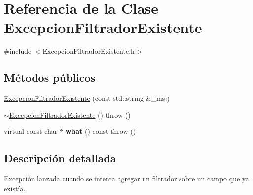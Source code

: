 \hypertarget{classExcepcionFiltradorExistente}{\section{\-Referencia de la \-Clase \-Excepcion\-Filtrador\-Existente}
\label{classExcepcionFiltradorExistente}
}


{\ttfamily \#include $<$\-Excepcion\-Filtrador\-Existente.\-h$>$}

\subsection*{\-Métodos públicos}
\begin{DoxyCompactItemize}
\item 
\hyperlink{classExcepcionFiltradorExistente_a141e6e3e10c3780931f4e9de9251b8e6}{\-Excepcion\-Filtrador\-Existente} (const std\-::string \&\-\_\-msj)
\item 
\hyperlink{classExcepcionFiltradorExistente_acdc3c754afe1d230969af44ca6193228}{$\sim$\-Excepcion\-Filtrador\-Existente} ()  throw ()
\item 
\hypertarget{classExcepcionFiltradorExistente_a5d85b192ae75e5c8554ae40108643c89}{virtual const char $\ast$ {\bfseries what} () const   throw ()}\label{classExcepcionFiltradorExistente_a5d85b192ae75e5c8554ae40108643c89}

\end{DoxyCompactItemize}


\subsection{\-Descripción detallada}
\-Excepción lanzada cuando se intenta agregar un filtrador sobre un campo que ya existía. 

